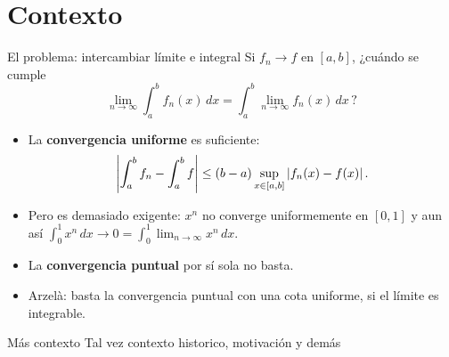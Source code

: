 \section{Contexto}

\begin{frame}{El problema: intercambiar límite e integral}
    Si $f_n \to f$ en $[a,b]$, ¿cuándo se cumple
    \[
        \lim_{n\to\infty}\int_a^b f_n(x)\,dx = \int_a^b \lim_{n\to\infty} f_n(x)\,dx\,?
    \]
    \begin{itemize}
        \item La \textbf{convergencia uniforme} es suficiente:
        \[
            \left\lvert \int_a^b f_n-\int_a^b f \right\rvert\le (b-a)\sup_{x\in[a,b]}\left\lvert f_n(x)-f(x) \right\rvert.
        \]
        \item Pero es demasiado exigente: $x^n$ no converge uniformemente en $[0,1]$ y aun así $\int_0^1 x^n\,dx\to 0=\int_0^1 \lim_{n\to\infty} x^n\,dx$.
        \item La \textbf{convergencia puntual} por sí sola no basta.
        \item \alert{Arzelà:} basta la convergencia puntual con una cota uniforme, si el límite es integrable.
    \end{itemize}
\end{frame}


\begin{frame}{Más contexto}
    Tal vez contexto historico, motivación y demás
\end{frame}
